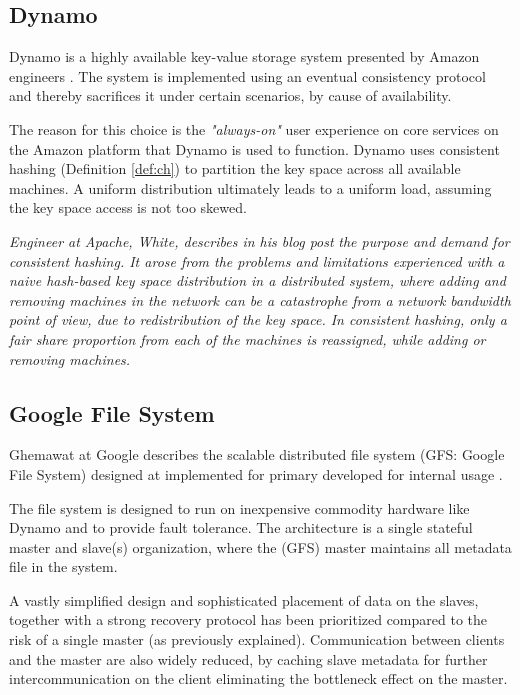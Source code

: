 \subsection*{Dynamo}
Dynamo is a highly available key-value storage system presented by Amazon engineers \cite{DeCandia:2007:DAH:1294261.1294281}. The system is implemented using an eventual consistency protocol and thereby sacrifices it under certain scenarios, by cause of availability. 

The reason for this choice is the \textit{"always-on"} user experience on core services on the Amazon platform that Dynamo is used to function. Dynamo uses consistent hashing (Definition \ref{def:ch}) to partition the key space across all available machines. A uniform distribution ultimately leads to a uniform load, assuming the key space access is not too skewed.
\vspace*{3mm}

\begin{definition} \label{def:ch}
\textit{Engineer at Apache, White, describes in his blog post} \cite{PageWhiteCH} \textit{the purpose and demand for consistent hashing. It arose from the problems and limitations experienced with a naive hash-based key space distribution in a distributed system, where adding and removing machines in the network can be a catastrophe from a network bandwidth point of view, due to redistribution of the key space. In consistent hashing, only a fair share proportion from each of the machines is reassigned, while adding or removing machines.}
\end{definition}

\subsection*{Google File System}
Ghemawat \etal at Google describes the scalable distributed file system (GFS: Google File System) designed at implemented for primary developed for internal usage \cite{Ghemawat:2003:GFS:945445.945450}. 

The file system is designed to run on inexpensive commodity hardware like Dynamo and to provide fault tolerance. The architecture is a single stateful master and slave(s) organization, where the (GFS) master maintains all metadata file in the system. 
\newline

A vastly simplified design and sophisticated placement of data on the slaves, together with a strong recovery protocol has been prioritized compared to the risk of a single master (as previously explained). Communication between clients and the master are also widely reduced, by caching slave metadata for further intercommunication on the client eliminating the bottleneck effect on the master.
\vspace*{3mm}

